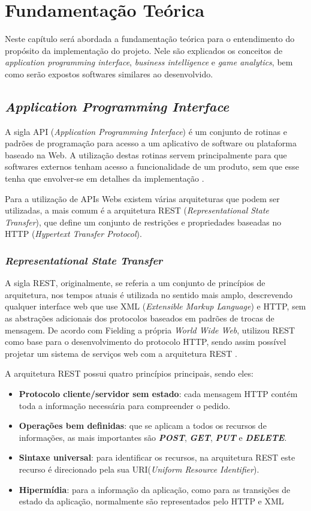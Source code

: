 \chapter[Fundamentação Teórica]{Fundamentação Teórica}
Neste capítulo será abordada a fundamentação teórica para o entendimento do propósito da implementação do projeto. Nele são explicados os conceitos de \textit{application programming interface}, \textit{business intelligence} e \textit{game analytics}, bem como serão expostos softwares similares ao desenvolvido.

\section{\textit{Application Programming Interface}}
A sigla API (\textit{Application Programming Interface}) é um conjunto de rotinas e padrões de programação para acesso a um aplicativo de software ou plataforma baseado na Web. A utilização destas rotinas servem principalmente para que softwares externos tenham acesso a funcionalidade de um produto, sem que esse tenha que envolver-se em detalhes da implementação \cite{api}.

Para a utilização de APIs Webs existem várias arquiteturas que podem ser utilizadas, a mais comum é a arquitetura REST (\textit{Representational State Transfer}), que define um conjunto de restrições e propriedades baseadas no HTTP (\textit{Hypertext Transfer Protocol}).
\subsection{\textit{Representational State Transfer}}
A sigla REST, originalmente, se referia a um conjunto de princípios de arquitetura, nos tempos atuais é utilizada no sentido mais amplo, descrevendo qualquer interface web que use XML (\textit{Extensible Markup Language}) e HTTP, sem as abstrações adicionais dos protocolos baseados em padrões de trocas de mensagem. De acordo com Fielding a própria \textit{World Wide Web}, utilizou REST como base para o desenvolvimento do protocolo HTTP, sendo assim possível projetar um sistema de serviços web com a arquitetura REST \cite{fielding}.

A arquitetura REST possui quatro princípios principais, sendo eles:
\begin{itemize}
	\item \textbf{Protocolo cliente/servidor sem estado}: cada mensagem HTTP contém toda a informação necessária para compreender o pedido.
	\item \textbf{Operações bem definidas}: que se aplicam a todos os recursos de informações, as mais importantes são \textit{\textbf{POST}}, \textit{\textbf{GET}}, \textit{\textbf{PUT}} e \textit{\textbf{DELETE}}.
	\item \textbf{Sintaxe universal}: para identificar os recursos, na arquitetura REST este recurso é direcionado pela sua URI(\textit{Uniform Resource Identifier}).
	\item \textbf{Hipermídia}: para a informação da aplicação, como para as transições de estado da aplicação, normalmente são representados pelo HTTP e XML
\end{itemize}

